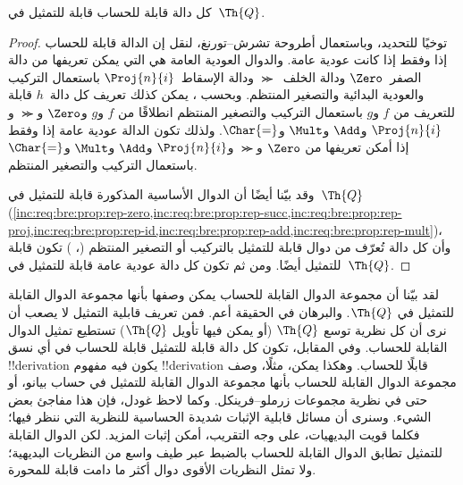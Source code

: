 \documentclass[../../../include/open-logic-section]{subfiles}
\begin{document}

\begin{thm}
كل دالة قابلة للحساب قابلة للتمثيل في~$\Th{Q}$.
\end{thm}

\begin{proof}
توخيًا للتحديد، وباستعمال أطروحة تشرش--تورنغ، لنقل إن الدالة قابلة
للحساب إذا وفقط إذا كانت عودية عامة. والدوال العودية العامة هي التي
يمكن تعريفها من دالة الصفر~$\Zero$ ودالة الخلف~$\Succ$ ودالة
الإسقاط~$\Proj{n}{i}$ باستعمال التركيب والعودية البدائية والتصغير
المنتظم. وبحسب ، يمكن كذلك تعريف كل دالة~$h$
قابلة للتعريف من $f$ و$g$ باستعمال التركيب والتصغير المنتظم انطلاقًا
من $f$ و$g$ و$\Zero$ و$\Succ$ و$\Proj{n}{i}$ و$\Add$ و$\Mult$
و$\Char{=}$. ولذلك تكون الدالة عودية عامة إذا وفقط إذا أمكن تعريفها
من $\Zero$ و$\Succ$ و$\Proj{n}{i}$ و$\Add$ و$\Mult$ و$\Char{=}$
باستعمال التركيب والتصغير المنتظم.

وقد بيّنا أيضًا أن الدوال الأساسية المذكورة قابلة للتمثيل في~$\Th{Q}$
(\cref{inc:req:bre:prop:rep-zero,inc:req:bre:prop:rep-succ,inc:req:bre:prop:rep-proj,inc:req:bre:prop:rep-id,inc:req:bre:prop:rep-add,inc:req:bre:prop:rep-mult})،
وأن كل دالة تُعرّف من دوال قابلة للتمثيل بالتركيب أو التصغير المنتظم
(،
) تكون قابلة للتمثيل أيضًا. ومن ثم
تكون كل دالة عودية عامة قابلة للتمثيل في~$\Th{Q}$.
\end{proof}

\begin{explain}
لقد بيّنا أن مجموعة الدوال القابلة للحساب يمكن وصفها بأنها مجموعة
الدوال القابلة للتمثيل في $\Th{Q}$. والبرهان في الحقيقة أعم. فمن
تعريف قابلية التمثيل لا يصعب أن نرى أن كل نظرية توسع $\Th{Q}$ (أو
يمكن فيها تأويل $\Th{Q}$) تستطيع تمثيل الدوال القابلة للحساب. وفي
المقابل، تكون كل دالة قابلة للتمثيل قابلة للحساب في أي نسق
!!{derivation} يكون فيه مفهوم !!{derivation} قابلًا للحساب. وهكذا
يمكن، مثلًا، وصف مجموعة الدوال القابلة للحساب بأنها مجموعة الدوال
القابلة للتمثيل في حساب بيانو، أو حتى في نظرية مجموعات
زرملو--فرينكل. وكما لاحظ غودل، فإن هذا مفاجئ بعض الشيء. وسنرى أن
مسائل قابلية الإثبات شديدة الحساسية للنظرية التي ننظر فيها؛ فكلما
قويت البديهيات، على وجه التقريب، أمكن إثبات المزيد. لكن الدوال
القابلة للتمثيل تطابق الدوال القابلة للحساب بالضبط عبر طيف واسع من
النظريات البديهية؛ ولا تمثل النظريات الأقوى دوال أكثر ما دامت قابلة
للمحورة.
\end{explain}
\end{document}
